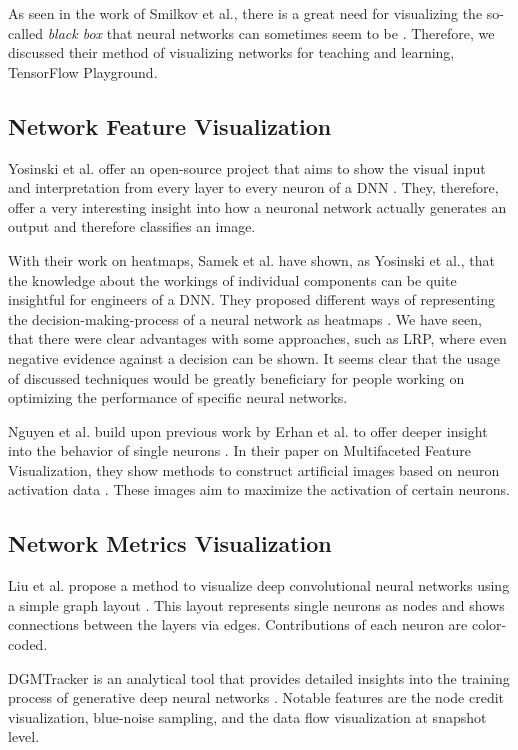 \documentclass{acmsiggraph}               %
\begin{document}
As seen in the work of Smilkov et al., there is a great need for visualizing the so-called \textit{black box} that neural networks can sometimes seem to be \cite{Smilkov2017}. Therefore, we discussed their method of visualizing networks for teaching and learning, TensorFlow Playground.

\subsection{Network Feature Visualization}

Yosinski et al. offer an open-source project that aims to show the visual input and interpretation from every layer to every neuron of a DNN \cite{Yosinski2015}. They, therefore, offer a very interesting insight into how a neuronal network actually generates an output and therefore classifies an image.

With their work on heatmaps, Samek et al. have shown, as Yosinski et al., that the knowledge about the workings of individual components can be quite insightful for engineers of a DNN. They proposed different ways of representing the decision-making-process of a neural network as heatmaps \cite{Samek2017}. We have seen, that there were clear advantages with some approaches, such as LRP, where even negative evidence against a decision can be shown. It seems clear that the usage of discussed techniques would be greatly beneficiary for people working on optimizing the performance of specific neural networks.

Nguyen et al. build upon previous work by Erhan et al. to offer deeper insight into the behavior of single neurons \cite{Nguyen2016,Erhan2009}. In their paper on Multifaceted Feature Visualization, they show methods to construct artificial images based on neuron activation data \cite{Nguyen2016}. These images aim to maximize the activation of certain neurons.

\subsection{Network Metrics Visualization}
Liu et al. propose a method to visualize deep convolutional neural networks using a simple graph layout \cite{Liu2016}. This layout represents single neurons as nodes and shows connections between the layers via edges. Contributions of each neuron are color-coded.

DGMTracker is an analytical tool that provides detailed insights into the training process of generative deep neural networks \cite{Liu2018}. Notable features are the node credit visualization, blue-noise sampling, and the data flow visualization at snapshot level.
\end{document}

